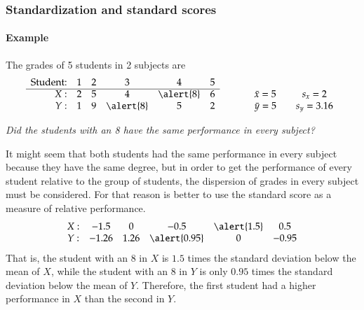 \begin{frame}
\frametitle{Standardization and standard scores}
\framesubtitle{Example}
The grades of 5 students in 2 subjects are
\[
\begin{array}{rccccccccc}
\mbox{Student:} & 1 & 2 & 3 & 4 & 5\\ \cline{1-6}
X: & 2 & 5 & 4 & \alert{8} & 6 & \qquad & \bar x = 5 & \quad s_x = 2\\
Y: & 1 & 9 & \alert{8} & 5 & 2 & \qquad & \bar y = 5 & \quad s_y = 3.16\\
\end{array}
\]
\begin{center}
\emph{Did the students with an 8 have the same performance in every subject?}
\end{center}
It might seem that both students had the same performance in every subject because they have the same
degree, but in order to get the performance of every student relative to the group of students, the dispersion
of grades in every subject must be considered.
For that reason is better to use the standard score as a measure of relative performance. 
\[
\begin{array}{cccccc}
X: & -1.5 & 0 & -0.5 & \alert{1.5} & 0.5 \\
Y: & -1.26 & 1.26 & \alert{0.95} & 0 & -0.95\\
\end{array}
\]
That is, the student with an 8 in $X$ is $1.5$ times the standard deviation below the mean of $X$, while the student
with an 8 in $Y$ is only $0.95$ times the standard deviation below the mean of $Y$. 
Therefore, the first student had a higher performance in $X$ than the second in $Y$.
\end{frame}


